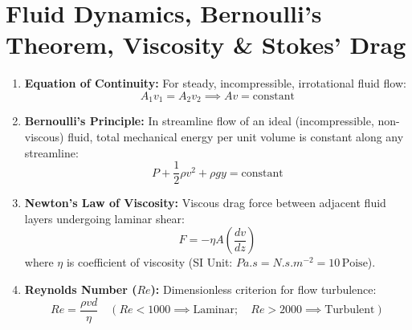 \documentclass[10pt,twoside,openright]{book}
\begin{document}
\section{Fluid Dynamics, Bernoulli's Theorem, Viscosity \& Stokes' Drag}

\begin{conceptbox}
\begin{enumerate}[leftmargin=*]
  \item \textbf{Equation of Continuity:} For steady, incompressible, irrotational fluid flow:
  \begin{equation}
    A_1 v_1 = A_2 v_2 \implies A v = \text{constant}
  \end{equation}
  \item \textbf{Bernoulli's Principle:} In streamline flow of an ideal (incompressible, non-viscous) fluid, total mechanical energy per unit volume is constant along any streamline:
  \begin{equation}
    P + \frac{1}{2}\rho v^2 + \rho g y = \text{constant}
  \end{equation}
  \item \textbf{Newton's Law of Viscosity:} Viscous drag force between adjacent fluid layers undergoing laminar shear:
  \begin{equation}
    F = -\eta A \left(\frac{dv}{dz}\right)
  \end{equation}
  where $\eta$ is coefficient of viscosity (SI Unit: $\si{Pa.s} = \si{N.s.m^{-2}} = 10\,\text{Poise}$).
  \item \textbf{Reynolds Number ($Re$):} Dimensionless criterion for flow turbulence:
  \begin{equation}
    Re = \frac{\rho v d}{\eta} \quad (Re < 1000 \implies \text{Laminar}; \quad Re > 2000 \implies \text{Turbulent})
  \end{equation}
\end{enumerate}
\end{conceptbox}
\end{document}

